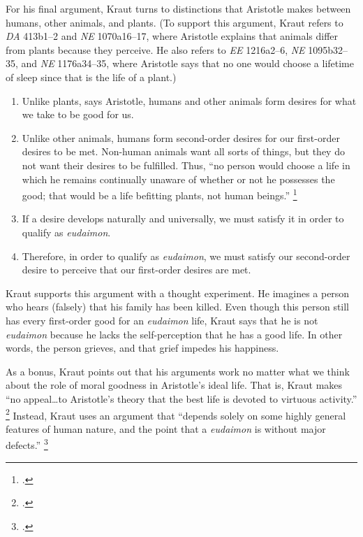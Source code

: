 \documentclass[12pt,letterpaper]{article}
\begin{document}
For his final argument, Kraut turns to distinctions that Aristotle makes between humans, other animals, and plants.
(To support this argument, Kraut refers to \textit{DA} 413b1--2 and \textit{NE} 1070a16--17, where Aristotle explains that animals differ from plants because they perceive.
He also refers to \textit{EE} 1216a2--6, \textit{NE} 1095b32--35, and \textit{NE} 1176a34--35, where Aristotle says that no one would choose a lifetime of sleep since that is the life of a plant.)

\begin{enumerate}
    \item Unlike plants, says Aristotle, humans and other animals form desires for what we take to be good for us.
    \item Unlike other animals, humans form second-order desires for our first-order desires to be met.
        Non-human animals want all sorts of things, but they do not want their desires to be fulfilled.
        Thus, ``no person would choose a life in which he remains continually unaware of whether or not he possesses the good; that would be a life befitting plants, not human beings.''%
        \footcite[][172]{two-conceptions-of-happiness-kraut-1979}
    \item If a desire develops naturally and universally, we must satisfy it in order to qualify as \textit{eudaimon}.
    \item Therefore, in order to qualify as \textit{eudaimon}, we must satisfy our second-order desire to perceive that our first-order desires are met.
\end{enumerate}

Kraut supports this argument with a thought experiment.
He imagines a person who hears (falsely) that his family has been killed.
Even though this person still has every first-order good for an \textit{eudaimon} life, Kraut says that he is not \textit{eudaimon} because he lacks the self-perception that he has a good life.
In other words, the person grieves, and that grief impedes his happiness.

As a bonus, Kraut points out that his arguments work no matter what we think about the role of moral goodness in Aristotle's ideal life.
That is, Kraut makes ``no appeal\dots to Aristotle's theory that the best life is devoted to virtuous activity.''%
\footcite[][174]{two-conceptions-of-happiness-kraut-1979}
Instead, Kraut uses an argument that ``depends solely on some highly general features of human nature, and the point that a \textit{eudaimon} is without major defects.''%
\footcite[][174]{two-conceptions-of-happiness-kraut-1979}
\end{document}
